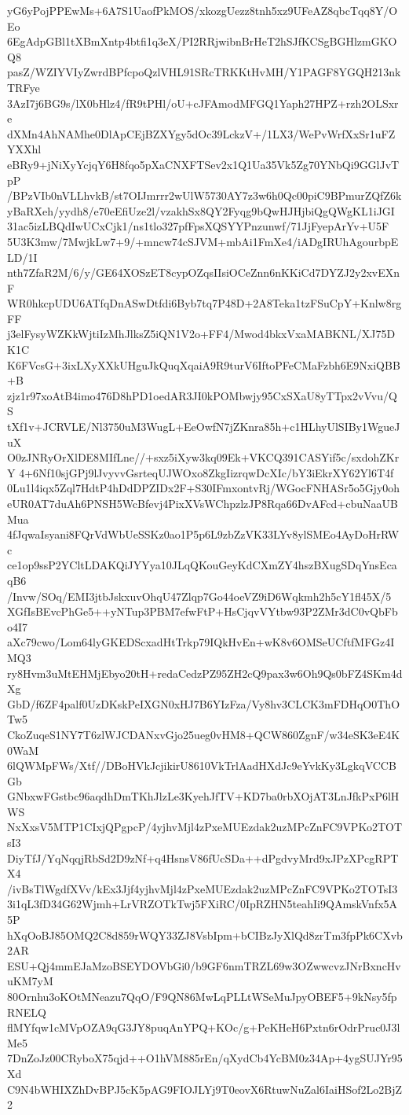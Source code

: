 yG6yPojPPEwMs+6A7S1UaofPkMOS/xkozgUezz8tnh5xz9UFeAZ8qbcTqq8Y/OEo
6EgAdpGBl1tXBmXntp4btfi1q3eX/PI2RRjwibnBrHeT2hSJfKCSgBGHlzmGKOQ8
pasZ/WZIYVIyZwrdBPfcpoQzlVHL91SRcTRKKtHvMH/Y1PAGF8YGQH213nkTRFye
3AzI7j6BG9s/lX0bHlz4/fR9tPHl/oU+cJFAmodMFGQ1Yaph27HPZ+rzh2OLSxre
dXMn4AhNAMhe0DlApCEjBZXYgy5dOc39LckzV+/1LX3/WePvWrfXxSr1uFZYXXhl
eBRy9+jNiXyYcjqY6H8fqo5pXaCNXFTSev2x1Q1Ua35Vk5Zg70YNbQi9GGlJvTpP
/BPzVIb0nVLLhvkB/st7OIJmrrr2wUlW5730AY7z3w6h0Qc00piC9BPmurZQfZ6k
yBaRXeh/yydh8/e70eEfiUze2l/vzakhSx8QY2Fyqg9bQwHJHjbiQgQWgKL1iJGI
31ac5izLBQdIwUCxCjk1/ns1tlo327pfFpsXQSYYPnzunwf/71JjFyepArYv+U5F
5U3K3mw/7MwjkLw7+9/+mncw74cSJVM+mbAi1FmXe4/iADgIRUhAgourbpELD/1I
nth7ZfaR2M/6/y/GE64XOSzET8cypOZqsIIsiOCeZnn6nKKiCd7DYZJ2y2xvEXnF
WR0hkcpUDU6ATfqDnASwDtfdi6Byb7tq7P48D+2A8Teka1tzFSuCpY+Knlw8rgFF
j3elFysyWZKkWjtiIzMhJlksZ5iQN1V2o+FF4/Mwod4bkxVxaMABKNL/XJ75DK1C
K6FVcsG+3ixLXyXXkUHguJkQuqXqaiA9R9turV6IftoPFeCMaFzbh6E9NxiQBB+B
zjz1r97xoAtB4imo476D8hPD1oedAR3JI0kPOMbwjy95CxSXaU8yTTpx2vVvu/QS
tXf1v+JCRVLE/Nl3750uM3WugL+EeOwfN7jZKnra85h+c1HLhyUlSIBy1WgueJuX
O0zJNRyOrXlDE8MIfLne//+sxz5iXyw3kq09Ek+VKCQ391CASYif5c/sxdohZKrY
4+6Nf10sjGPj9lJvyvvGsrteqUJWOxo8ZkgIizrqwDcXIc/bY3iEkrXY62Yl6T4f
0Lu1l4iqx5Zql7HdtP4hDdDPZIDx2F+S30IFmxontvRj/WGocFNHASr5o5Gjy0oh
eUR0AT7duAh6PNSH5WcBfevj4PixXVsWChpzlzJP8Rqa66DvAFcd+cbuNaaUBMua
4fJqwaIsyani8FQrVdWbUeSSKz0ao1P5p6L9zbZzVK33LYv8ylSMEo4AyDoHrRWc
ce1op9ssP2YCltLDAKQiJYYya10JLqQKouGeyKdCXmZY4hszBXugSDqYnsEcaqB6
/Invw/SOq/EMI3jtbJskxuvOhqU47Zlqp7Go44oeVZ9iD6Wqkmh2h5cY1fl45X/5
XGfIsBEvcPhGe5++yNTup3PBM7efwFtP+HsCjqvVYtbw93P2ZMr3dC0vQbFbo4I7
aXc79cwo/Lom64lyGKEDScxadHtTrkp79IQkHvEn+wK8v6OMSeUCftfMFGz4IMQ3
ry8Hvm3uMtEHMjEbyo20tH+redaCedzPZ95ZH2cQ9pax3w6Oh9Qs0bFZ4SKm4dXg
GbD/f6ZF4palf0UzDKskPeIXGN0xHJ7B6YIzFza/Vy8hv3CLCK3mFDHqO0ThOTw5
CkoZuqeS1NY7T6zlWJCDANxvGjo25ueg0vHM8+QCW860ZgnF/w34eSK3eE4K0WaM
6lQWMpFWs/Xtf//DBoHVkJcjikirU8610VkTrlAadHXdJc9eYvkKy3LgkqVCCBGb
GNbxwFGstbc96aqdhDmTKhJlzLe3KyehJfTV+KD7ba0rbXOjAT3LnJfkPxP6lHWS
NxXxsV5MTP1CIxjQPgpcP/4yjhvMjl4zPxeMUEzdak2uzMPcZnFC9VPKo2TOTsI3
DiyTfJ/YqNqqjRbSd2D9zNf+q4HsnsV86fUcSDa++dPgdvyMrd9xJPzXPcgRPTX4
/ivBsTlWgdfXVv/kEx3Jjf4yjhvMjl4zPxeMUEzdak2uzMPcZnFC9VPKo2TOTsI3
3i1qL3fD34G62Wjmh+LrVRZOTkTwj5FXiRC/0IpRZHN5teahIi9QAmskVnfx5A5P
hXqOoBJ85OMQ2C8d859rWQY33ZJ8VsbIpm+bCIBzJyXlQd8zrTm3fpPk6CXvb2AR
ESU+Qj4mmEJaMzoBSEYDOVbGi0/b9GF6nmTRZL69w3OZwwcvzJNrBxncHvuKM7yM
80Ornhu3oKOtMNeazu7QqO/F9QN86MwLqPLLtWSeMuJpyOBEF5+9kNsy5fpRNELQ
flMYfqw1cMVpOZA9qG3JY8puqAnYPQ+KOc/g+PeKHeH6Pxtn6rOdrPruc0J3lMe5
7DnZoJz00CRyboX75qjd++O1hVM885rEn/qXydCb4YcBM0z34Ap+4ygSUJYr95Xd
C9N4bWHIXZhDvBPJ5cK5pAG9FIOJLYj9T0eovX6RtuwNuZal6IaiHSof2Lo2BjZ2
